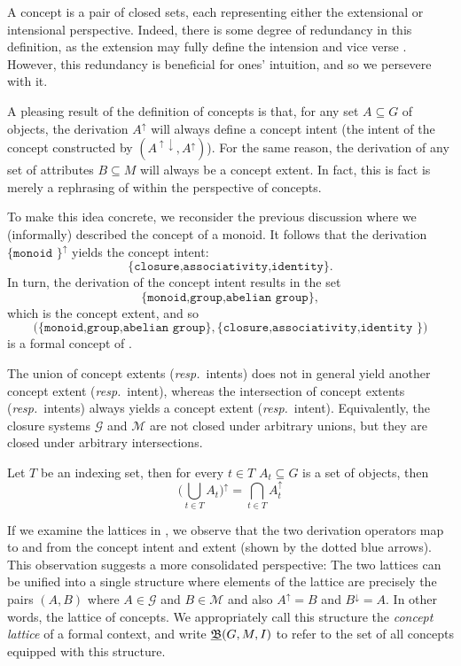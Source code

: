 A concept is a pair of closed sets, each representing either the extensional or
intensional perspective. Indeed, there is some degree of redundancy in this
definition, as the extension may fully define the intension and vice verse \cite{ganter2016conceptual}.
However, this redundancy is beneficial for ones' intuition, and so we persevere with
it.

A pleasing result of the definition of concepts is that, for any set
$A \subseteq G$ of objects, the derivation $A^{\uparrow}$ will always define a concept
intent (the intent of the concept constructed by
$(A^{\uparrow \downarrow}, A^{\uparrow})$). For the same reason, the derivation of
any set of attributes $B \subseteq M$ will always be a concept extent. In fact, this
is fact is merely a rephrasing of  within
the perspective of concepts.

To make this idea concrete, we reconsider the previous discussion where we (informally)
described the concept of a monoid. It follows that the derivation $\{\texttt{monoid
	}\}^{\uparrow}$ yields the concept intent:
\[
	\{\texttt{closure,associativity,identity}\}.
\]
%
In turn, the derivation of the concept intent results in the set
\[
	\{\texttt{monoid,group,abelian group}\},
\]which is the concept extent, and so
\[
	\big(\{\texttt{monoid,group,abelian group}\}, \{\texttt{closure,associativity,identity
	}\}\big)
\]
is a formal concept of .

The union of concept extents (\textit{resp.}\ intents) does not in general yield
another concept extent (\textit{resp.}\ intent), whereas the intersection of
concept extents (\textit{resp.}\ intents) always yields a concept extent (\textit{resp.}\ intent).
Equivalently, the closure systems $\mathcal{G}$ and $\mathcal{M}$ are not closed
under arbitrary unions, but they are closed under arbitrary intersections.

\begin{proposition}
	\label{proposition:intersection-union-concepts} Let $T$ be an indexing set,
	then for every $t \in T$ $A_{t}\subseteq G$ is a set of objects, then
	\[
		\big( \underset{t \in T}\bigcup A_{t}\big)^{\uparrow}= \underset{t \in T}\bigcap
		A_{t}^{\uparrow}
	\]
\end{proposition}

If we examine the lattices in , we observe that the two
derivation operators map to and from the concept intent and extent (shown by the
dotted blue arrows). This observation suggests a more consolidated perspective: The
two lattices can be unified into a single structure where elements of the lattice
are precisely the pairs $(A,B)$ where $A \in \mathcal{G}$ and $B \in \mathcal{M}$
and also $A^{\uparrow}= B$ and $B^{\downarrow}= A$. In other words, the lattice of
concepts. We appropriately call this structure the \textit{concept lattice} of a
formal context, and write $\underline{{\mathfrak B}} (G,M,\mathrel{I})$ to refer to the set of all concepts equipped
with this structure.

